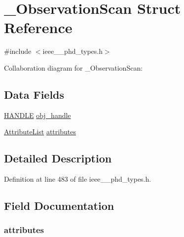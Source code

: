 \hypertarget{struct___observation_scan}{}\section{\+\_\+\+Observation\+Scan Struct Reference}
\label{struct___observation_scan}


{\ttfamily \#include $<$ieee\+\_\+\_\+phd\+\_\+types.\+h$>$}



Collaboration diagram for \+\_\+\+Observation\+Scan\+:
\subsection*{Data Fields}
\begin{DoxyCompactItemize}
\item 
\hyperlink{ieee__11073__phd__types_8h_a76f0d44d294babf2e568f7ee676ffca6}{H\+A\+N\+D\+L\+E} \hyperlink{struct___observation_scan_abbfff52b7a4956021522f5750c4b32c6}{obj\+\_\+handle}
\item 
\hyperlink{ieee__11073__phd__types_8h_a87a34d3be532804006242c172e4beea2}{Attribute\+List} \hyperlink{struct___observation_scan_aa10e6a803609d25fcb5bda2611706823}{attributes}
\end{DoxyCompactItemize}


\subsection{Detailed Description}


Definition at line 483 of file ieee\+\_\+\_\+phd\+\_\+types.\+h.



\subsection{Field Documentation}
\hypertarget{struct___observation_scan_aa10e6a803609d25fcb5bda2611706823}{}
\subsubsection[{attributes}]{ attributes}\label{struct___observation_scan_aa10e6a803609d25fcb5bda2611706823}


